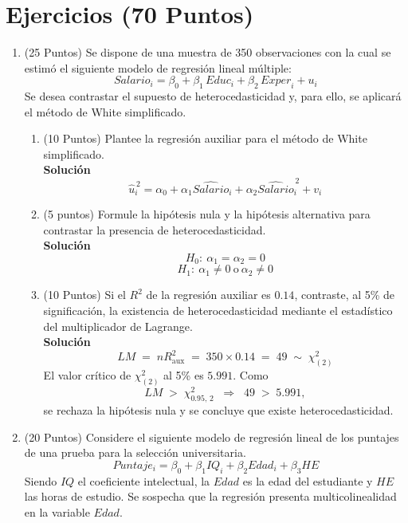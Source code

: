 \documentclass[10pt,a4paper]{article}
\begin{document}
\section{Ejercicios (70 Puntos)}

\begin{enumerate}

\item (25 Puntos) Se dispone de una muestra de 350 observaciones con la cual se estimó el siguiente modelo de regresión lineal múltiple:
$$Salario_i = \beta_0 + \beta_1\,\textit{Educ}_i + \beta_2\,\textit{Exper}_i + u_i$$
Se desea contrastar el supuesto de heterocedasticidad y, para ello, se aplicará el método de White simplificado.
\begin{enumerate}
    \item (10 Puntos) Plantee la regresión auxiliar para el método de White simplificado.\\
    \textbf{Solución}\\
    $$\hat{u}_i^{\,2} = \alpha_0 + \alpha_1 \hat{Salario}_i + \alpha_2 \hat{Salario}_i^{\,2} + v_i$$
    
    \item (5 puntos) Formule la hipótesis nula y la hipótesis alternativa para contrastar la presencia de heterocedasticidad.\\
    \textbf{Solución}\\
    $$H_0:\ \alpha_1 = \alpha_2 = 0$$
    $$H_1:\ \alpha_1 \neq 0 \ \text{o}\ \alpha_2 \neq 0$$
    
    \item (10 Puntos) Si el $R^2$ de la regresión auxiliar es $0.14$, contraste, al 5\% de significación, la existencia de heterocedasticidad mediante el estadístico del multiplicador de Lagrange.\\
    \textbf{Solución}\\
    $$LM \;=\; n R^2_{\text{aux}} \;=\; 350 \times 0.14 \;=\; 49 \;\sim\; \chi^2_{(2)}$$
    El valor crítico de $\chi^2_{(2)}$ al 5\% es $5.991$. Como
    $$LM \;>\; \chi^2_{0.95,\,2} \;\; \Longrightarrow \;\; 49 \;>\; 5.991,$$
    se rechaza la hipótesis nula y se concluye que existe heterocedasticidad.
\end{enumerate}

\item (20 Puntos) Considere el siguiente modelo de regresión lineal  de los puntajes de una prueba para la selección universitaria.
$$Puntaje_i = \beta_0 + \beta_1 IQ_i + \beta_2 Edad_i + \beta_3 HE$$
Siendo $IQ$ el coeficiente intelectual, la $Edad$ es la edad del estudiante y $HE$ las horas de estudio. Se sospecha que la regresión presenta multicolinealidad en la variable $Edad$. 


\end{enumerate}
\end{document}
